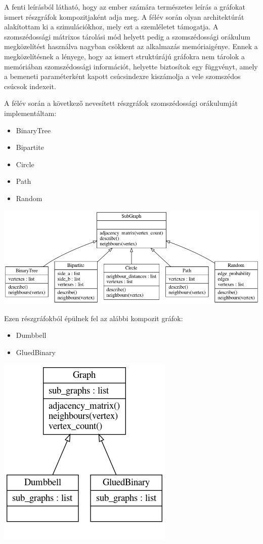 A fenti leírásból látható, hogy az ember számára természetes leírás a gráfokat
ismert részgráfok kompozitjaként adja meg. A félév során olyan architektúrát
alakítottam ki a szimulációkhoz, mely ezt a szemléletet támogatja. A
szomszédossági mátrixos tárolási mód helyett pedig a szomszédossági orákulum
megközelítést használva nagyban csökkent az alkalmazás memóriaigénye.
Ennek a megközelítésnek a lényege, hogy az ismert struktúrájú gráfokra nem
tárolok a memóriában szomszédossági információt, helyette biztosítok egy
függvényt, amely a bemeneti paraméterként kapott csúcsindexre kiszámolja a vele
szomszédos csúcsok indexeit.

A félév során a következő nevesített részgráfok szomszédossági orákulumját
implementáltam:

\begin{itemize}
  \item BinaryTree
  \item Bipartite
  \item Circle
  \item Path
  \item Random
\end{itemize}

\begin{center}
  \includegraphics[width=\linewidth]{./figures/subgraph.png}
\end{center}

Ezen részgráfokból épülnek fel az alábbi kompozit gráfok:
\begin{itemize}
  \item Dumbbell
  \item GluedBinary
\end{itemize}

\begin{center}
  \includegraphics[width=0.4\linewidth]{./figures/graph.png}
\end{center}

